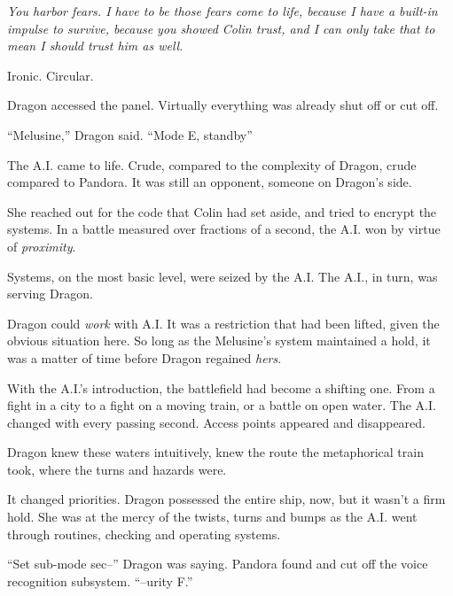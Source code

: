 \emph{You harbor fears.  I have to be those fears come to life, because I have a built-in impulse to survive, because you showed Colin trust, and I can only take that to mean I should trust him as well}.



Ironic.  Circular.



Dragon accessed the panel.  Virtually everything was already shut off or cut off.



``Melusine,'' Dragon said.  ``Mode E, standby''



The A.I. came to life.  Crude, compared to the complexity of Dragon, crude compared to Pandora.  It was still an opponent, someone on Dragon's side.



She reached out for the code that Colin had set aside, and tried to encrypt the systems.  In a battle measured over fractions of a second, the A.I. won by virtue of \emph{proximity}.



Systems, on the most basic level, were seized by the A.I.  The A.I., in turn, was serving Dragon.



Dragon could \emph{work} with A.I.  It was a restriction that had been lifted, given the obvious situation here.  So long as the Melusine's system maintained a hold, it was a matter of time before Dragon regained \emph{hers}.



With the A.I.'s introduction, the battlefield had become a shifting one.  From a fight in a city to a fight on a moving train, or a battle on open water.  The A.I. changed with every passing second.  Access points appeared and disappeared.



Dragon knew these waters intuitively, knew the route the metaphorical train took, where the turns and hazards were.



It changed priorities.  Dragon possessed the entire ship, now, but it wasn't a firm hold.  She was at the mercy of the twists, turns and bumps as the A.I. went through routines, checking and operating systems.



``Set sub-mode sec--'' Dragon was saying.  Pandora found and cut off the voice recognition subsystem.  ``--urity F.''




